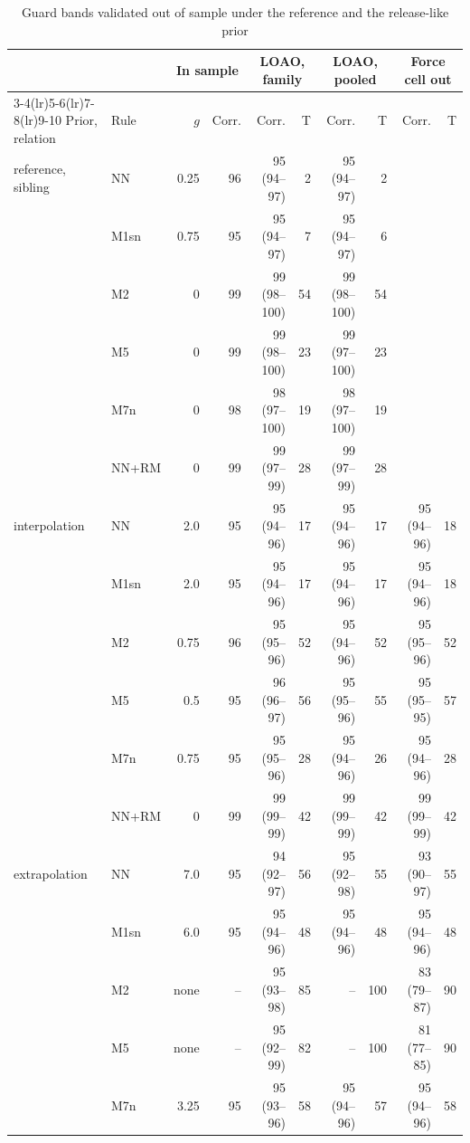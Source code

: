 \documentclass[pdflatex,sn-basic]{sn-jnl}
\newcommand{\tabsizesmall}{\footnotesize}
\begin{document}
\begin{table}[p]
\tabsizesmall
\setlength{\tabcolsep}{1.8pt}
\caption{Guard bands validated out of sample under the reference and the release-like prior}\label{tab:s-guard-oos}
\begin{tabular}{@{}llrrrrrrrr@{}}
\toprule
 & & \multicolumn{2}{c}{In sample} & \multicolumn{2}{c}{LOAO, family} & \multicolumn{2}{c}{LOAO, pooled} & \multicolumn{2}{c}{Force cell out} \\
\cmidrule(lr){3-4}\cmidrule(lr){5-6}\cmidrule(lr){7-8}\cmidrule(lr){9-10}
Prior, relation & Rule & $g$ & Corr. & Corr. & T & Corr. & T & Corr. & T \\
\midrule
reference, sibling & NN & 0.25 & 96 & 95 (94--97) & 2 & 95 (94--97) & 2 &  & \\
 & M1sn & 0.75 & 95 & 95 (94--97) & 7 & 95 (94--97) & 6 &  & \\
 & M2 & 0 & 99 & 99 (98--100) & 54 & 99 (98--100) & 54 &  & \\
 & M5 & 0 & 99 & 99 (98--100) & 23 & 99 (97--100) & 23 &  & \\
 & M7n & 0 & 98 & 98 (97--100) & 19 & 98 (97--100) & 19 &  & \\
 & NN+RM & 0 & 99 & 99 (97--99) & 28 & 99 (97--99) & 28 &  & \\
interpolation & NN & 2.0 & 95 & 95 (94--96) & 17 & 95 (94--96) & 17 & 95 (94--96) & 18 \\
 & M1sn & 2.0 & 95 & 95 (94--96) & 17 & 95 (94--96) & 17 & 95 (94--96) & 18 \\
 & M2 & 0.75 & 96 & 95 (95--96) & 52 & 95 (94--96) & 52 & 95 (95--96) & 52 \\
 & M5 & 0.5 & 95 & 96 (96--97) & 56 & 95 (95--96) & 55 & 95 (95--95) & 57 \\
 & M7n & 0.75 & 95 & 95 (95--96) & 28 & 95 (94--96) & 26 & 95 (94--96) & 28 \\
 & NN+RM & 0 & 99 & 99 (99--99) & 42 & 99 (99--99) & 42 & 99 (99--99) & 42 \\
extrapolation & NN & 7.0 & 95 & 94 (92--97) & 56 & 95 (92--98) & 55 & 93 (90--97) & 55 \\
 & M1sn & 6.0 & 95 & 95 (94--96) & 48 & 95 (94--96) & 48 & 95 (94--96) & 48 \\
 & M2 & none & -- & 95 (93--98) & 85 & -- & 100 & 83 (79--87) & 90 \\
 & M5 & none & -- & 95 (92--99) & 82 & -- & 100 & 81 (77--85) & 90 \\
 & M7n & 3.25 & 95 & 95 (93--96) & 58 & 95 (94--96) & 57 & 95 (94--96) & 58 \\

\end{tabular}
\end{table}
\end{document}
